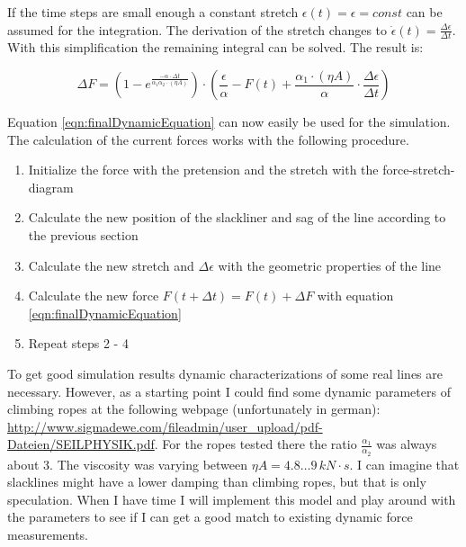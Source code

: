  If the time steps are small enough a constant stretch $\epsilon(t) = \epsilon = const$ can be assumed for the integration. The derivation of the stretch changes to $\dot{\epsilon}(t) = \frac{\Delta\epsilon}{\Delta t}$. With this simplification the remaining integral can be solved.
The result is:

\begin{equation}
	\Delta F = \left( 1 - e^{\frac{-\alpha\cdot\Delta t}{\alpha_1\alpha_2\cdot (\eta A)}} \right) \cdot \left( \frac{\epsilon}{\alpha} - F(t) + \frac{\alpha_1\cdot (\eta A)}{\alpha} \cdot \frac{\Delta\epsilon}{\Delta t} \right)
	\label{eqn:finalDynamicEquation}
\end{equation}

Equation \ref{eqn:finalDynamicEquation} can now easily be used for the simulation. The calculation of the current forces works with the following procedure.

\begin{enumerate}
	\item Initialize the force with the pretension and the stretch with the force-stretch-diagram
	\item Calculate the new position of the slackliner and sag of the line according to the previous section
	\item Calculate the new stretch and $\Delta\epsilon$ with the geometric properties of the line
	\item Calculate the new force $F(t+\Delta t) = F(t) + \Delta F$ with equation \ref{eqn:finalDynamicEquation}
	\item Repeat steps 2 - 4
\end{enumerate}


To get good simulation results dynamic characterizations of some real lines are necessary. However, as a starting point I could find some dynamic parameters of climbing ropes at the following webpage (unfortunately in german): \url{http://www.sigmadewe.com/fileadmin/user_upload/pdf-Dateien/SEILPHYSIK.pdf}.
For the ropes tested there the ratio $\frac{\alpha_1}{\alpha_2}$ was always about $3$. The viscosity was varying between $\eta A = 4.8 \dots 9\,kN\cdot s$. I can imagine that slacklines might have a lower damping than climbing ropes, but that is only speculation. When I have time I will implement this model and play around with the parameters to see if I can get a good match to existing dynamic force measurements.
